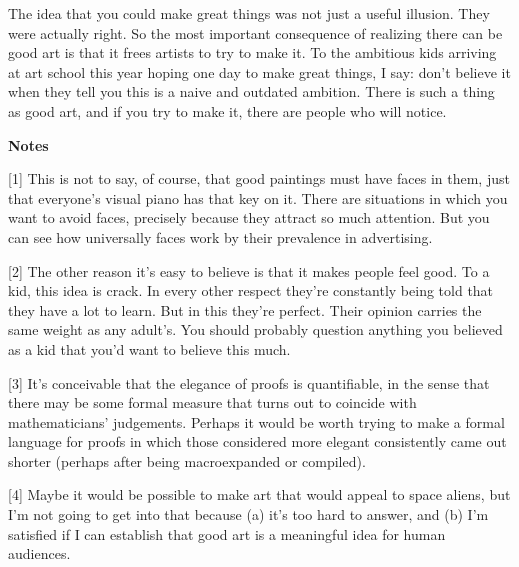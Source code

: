 The idea that you could make great
                  things was not just a useful illusion. They were actually
                  right. So the most important consequence of realizing there
                  can be good art is that it frees artists to try to make it. To
                  the ambitious kids arriving at art school this year hoping one
                  day to make great things, I say: don't believe it when they
                  tell you this is a naive and outdated ambition. There is such
                  a thing as good art, and if you try to make it, there are
                  people who will notice.





\textbf{Notes}

[1] This is not to say, of course, that good paintings must
                  have faces in them, just that everyone's visual piano has that
                  key on it. There are situations in which you want to avoid
                  faces, precisely because they attract so much attention. But
                  you can see how universally faces work by their prevalence in
                  advertising.

[2] The other reason it's easy to believe is that it makes
                  people feel good. To a kid, this idea is crack. In every other
                  respect they're constantly being told that they have a lot to
                  learn. But in this they're perfect. Their opinion carries the
                  same weight as any adult's. You should probably question
                  anything you believed as a kid that you'd want to believe this
                  much.

[3] It's conceivable that the elegance of proofs is
                  quantifiable, in the sense that there may be some formal
                  measure that turns out to coincide with mathematicians'
                  judgements. Perhaps it would be worth trying to make a formal
                  language for proofs in which those considered more elegant
                  consistently came out shorter (perhaps after being
                  macroexpanded or compiled).

[4] Maybe it would be possible to make art that would appeal to
                  space aliens, but I'm not going to get into that because (a)
                  it's too hard to answer, and (b) I'm satisfied if I can
                  establish that good art is a meaningful idea for human
                  audiences.

